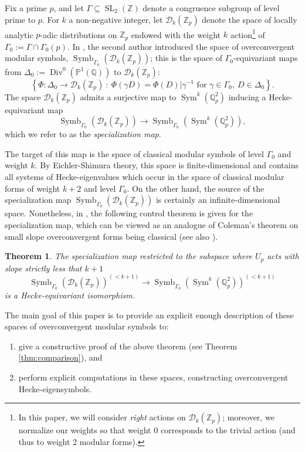 \documentclass{amsart}
\theoremstyle{plain}
\newtheorem{thm}{Theorem}[section]
\theoremstyle{definition}
\newcommand{\D}{{\mathcal D}}
\newcommand{\Z}{{\mathbb Z}}
\newcommand{\Q}{{\mathbb Q}}
\renewcommand{\P}{{\mathbb P}}
\newcommand{\Zp}{\Z_p}
\newcommand{\Qp}{\Q_p}
\newcommand{\lra}{\longrightarrow}
\newcommand{\Dvla}[1]{\D_{#1}(\Zp)}
\newcommand{\Dkla}{\Dvla{k}}
\DeclareMathOperator{\Div}{Div}
\DeclareMathOperator{\SL}{SL}
\DeclareMathOperator{\Symb}{Symb}
\DeclareMathOperator{\Sym}{Sym}
\newcommand{\MSo}[1]{\Symb_{\Gamma_0}(#1)}
\begin{document}
Fix a prime $p$, and let $\Gamma \subseteq \SL_2(\Z)$ denote a congruence subgroup of level prime to $p$.  For $k$ a non-negative integer, let $\Dkla$ denote the space of locally analytic $p$-adic distributions on $\Zp$ endowed with the weight $k$ action\footnote{In this paper, we will consider {\it right} actions on $\Dkla$; moreover, we normalize our weights so that weight 0 corresponds to the trivial action (and thus to weight 2 modular forms).}  of $\Gamma_0 := \Gamma \cap \Gamma_0(p)$.  In \cite{Stevens}, the second author introduced the space of overconvergent modular symbols, $\MSo{\Dkla}$; this is the space of $\Gamma_0$-equivariant maps from $\Delta_0 := \Div^0(\P^1(\Q))$ to $\Dkla$:
$$
\left\{ \Phi : \Delta_0 \to \Dkla ~:~ \Phi(\gamma D) = \Phi(D) \big| \gamma^{-1} \text{~for~} \gamma \in \Gamma_0, ~D \in \Delta_0 \right\}.
$$
The space $\Dkla$ admits a surjective map to $\Sym^k(\Qp^2)$ inducing a Hecke-equivariant map 
$$
\MSo{\Dkla} \lra \MSo{\Sym^k(\Qp^2)},
$$
which we refer to as the {\it specialization map}.  

The target of this map is the space of classical modular symbols of level $\Gamma_0$ and weight $k$.  By Eichler-Shimura theory, this space is finite-dimensional and contains all systems of Hecke-eigenvalues which occur in the space of classical modular forms of weight $k+2$ and level $\Gamma_0$.  On the other hand, the source of the specialization map $\MSo{\Dkla}$ is certainly an infinite-dimensional space.  Nonetheless, in \cite{Stevens}, the following control theorem is given for the specialization map, which can be viewed as an analogue of Coleman's theorem on small slope overconvergent forms being classical (see also \cite{PS}).

\begin{thm}
\label{thm:comp_intro}
The specialization map restricted to the subspace where $U_p$ acts with slope strictly less that $k+1$
$$
\MSo{\Dkla}^{(<k+1)} \lra  \MSo{\Sym^{k}(\Qp^2)}^{(<k+1)}
$$
is a Hecke-equivariant isomorphism.  
\end{thm}

The main goal of this paper is to provide an explicit enough description of these spaces of overconvergent modular symbols to:
\begin{enumerate}
\item give a constructive proof of the above theorem (see Theorem \ref{thm:comparison}), and 
\item perform explicit computations in these spaces, constructing overconvergent Hecke-eigensymbols.
\end{enumerate}
\end{document}
